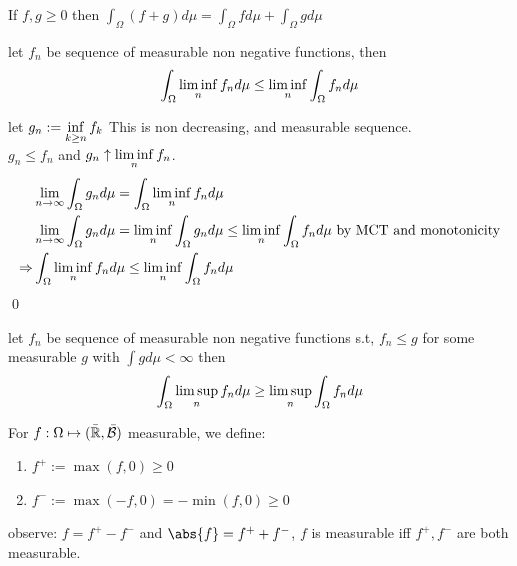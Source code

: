\begin{ex}If $f, g\geq 0$ then $\int_\Omega (f+g) d\mu = \int_\Omega f d\mu+\int_\Omega g d\mu$
\end{ex}
\newpage
\begin{thm}\label{Fatou}
let $f_n$ be sequence of measurable non negative functions, then 
\begin{equation*}
    \int_{\Omega} \liminf\limits_{n} f_n d\mu \leq \liminf\limits_{n}\int_{\Omega} f_n d\mu
\end{equation*}
\end{thm}
\pf let $g_n := \inf\limits_{k\geq n}f_k$ This is non decreasing, and measurable sequence. \\
$g_n \leq f_n$ and $g_n \uparrow \liminf\limits_{n}f_n$.
\begin{align*}
    &\lim\limits_{n\rightarrow\infty}\int_{\Omega} g_n d\mu = \int_{\Omega} \liminf\limits_{n}f_n d\mu \\
    &\lim\limits_{n\rightarrow\infty}\int_{\Omega} g_n d\mu = \liminf\limits_{n}\int_{\Omega} g_n d\mu \leq \liminf\limits_{n}\int_{\Omega} f_n d\mu \text{ by MCT and monotonicity}\\
    \Rightarrow& \int_{\Omega} \liminf\limits_{n}f_n d\mu \leq \liminf\limits_{n}\int_{\Omega} f_n d\mu
\end{align*}
\qed
\begin{ex}
let $f_n$ be sequence of measurable non negative functions s.t, $f_n\leq g$ for some measurable $g$ with $\int g d\mu < \infty$ then 
\begin{equation*}
    \int_{\Omega} \limsup\limits_{n} f_n d\mu \geq \limsup\limits_{n}\int_{\Omega} f_n d\mu
\end{equation*}
\end{ex}
\newpage
\begin{dfn}
For $f: \Omega \mapsto (\bar{\mathbb{R}}, \bar{\mathcal{B}})$ measurable, we define:
\begin{enumerate}
    \item $f^+ :=\max(f, 0) \geq 0$
    \item $f^- :=\max(-f, 0) = -\min(f, 0) \geq 0$
\end{enumerate}
\end{dfn}
observe: $f = f^+ - f^-$ and $\abs{f} = f^+ + f^-$, $f$ is measurable iff $f^+, f^-$ are both measurable.

